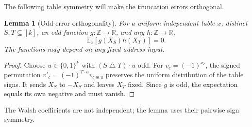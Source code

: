 \documentclass[11pt]{article}
\newtheorem{lemma}[theorem]{Lemma}
\newcommand{\bits}{\{0,1\}}
\begin{document}
The following table symmetry will make the truncation errors orthogonal.
\begin{lemma}[Odd-error orthogonality]\label{lem:odd}
For a uniform independent table $x$, distinct $S,T\subseteq[k]$,
an odd function $g:\mathbb Z\to\mathbb R$, and any $h:\mathbb Z\to\mathbb R$,
$$\mathbb E_x[g(X_S)h(X_T)]=0.$$
The functions may depend on any fixed address input.
\end{lemma}
\begin{proof}
Choose $u\in\bits^k$ with $(S\mathbin\triangle T)\cdot u$ odd.
For $v_c=(-1)^{x_c}$, the signed permutation
$v'_c=(-1)^{T\cdot u}v_{c\oplus u}$ preserves the uniform distribution
of the table signs. It sends $X_S$ to $-X_S$ and leaves $X_T$ fixed.
Since $g$ is odd, the expectation equals its own negative and must vanish.
\end{proof}
The Walsh coefficients are not independent; the lemma uses their
pairwise sign symmetry.
\end{document}
